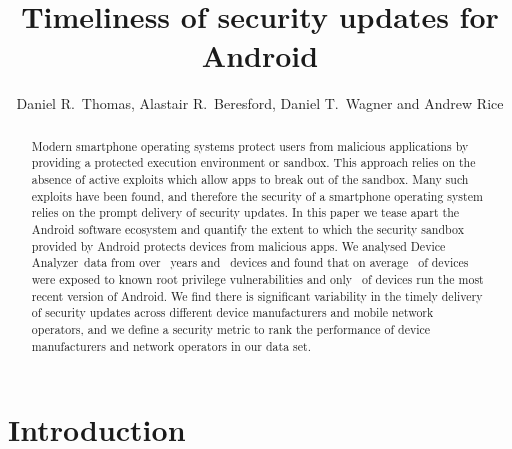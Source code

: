 \documentclass[conference,a4paper,twoside]{IEEEtran}
\author{Daniel R.\ Thomas, Alastair R.\ Beresford, Daniel T.\ Wagner and Andrew Rice}
\newcommand{\da}{Device Analyzer}
\newcommand{\percMarketShare}{83.6\%~\footnote{\url{http://www.theinquirer.net/inquirer/news/2379036/android-hits-836-percent-marketshare-while-ios-windows-and-blackberry-slide}}}
\begin{document}
\title{Timeliness of security updates for Android}


\author{
}




\maketitle


\begin{abstract}
Modern smartphone operating systems protect users from malicious applications by providing a protected execution environment or sandbox.
This approach relies on the absence of active exploits which allow apps to break out of the sandbox.
Many such exploits have been found, and therefore the security of a smartphone operating system relies on the prompt delivery of security updates.
In this paper we tease apart the Android software ecosystem and quantify the extent to which the security sandbox provided by Android protects devices from malicious apps.
We analysed \da\ data from over \daOSYearsOfData\ years and \daNumOSDevices\ devices and found that on average \daMeanInsecurityPercNominal\ of devices were exposed to known root privilege vulnerabilities and only \daUpdatednessPercNominal\ of devices run the most recent version of Android.
We find there is significant variability in the timely delivery of security updates across different device manufacturers and mobile network operators, and we define a security metric to rank the performance of device manufacturers and network operators in our data set.
\end{abstract}

\section{Introduction}
\end{document}
